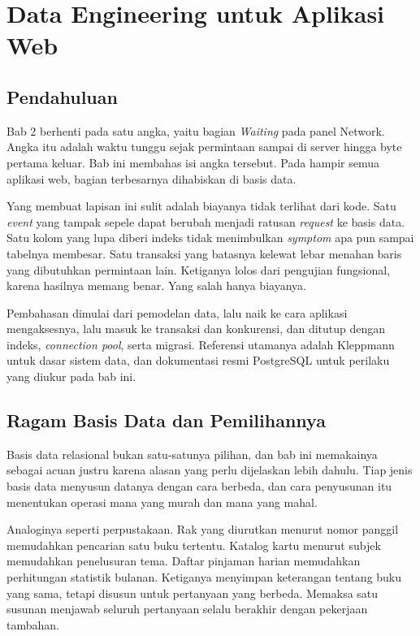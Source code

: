 \chapter{Data Engineering untuk Aplikasi Web}

\section{Pendahuluan}

Bab 2 berhenti pada satu angka, yaitu bagian \emph{Waiting} pada panel Network.
Angka itu adalah waktu tunggu sejak permintaan sampai di server hingga byte
pertama keluar. Bab ini membahas isi angka tersebut. Pada hampir semua aplikasi
web, bagian terbesarnya dihabiskan di basis data.

Yang membuat lapisan ini sulit adalah biayanya tidak terlihat dari kode. Satu
\textit{event} yang tampak sepele dapat berubah menjadi ratusan \textit{request}
ke basis data. Satu kolom yang lupa diberi indeks tidak menimbulkan \textit{symptom} apa
pun sampai tabelnya membesar. Satu transaksi yang batasnya kelewat lebar
menahan baris yang dibutuhkan permintaan lain. Ketiganya lolos dari pengujian
fungsional, karena hasilnya memang benar. Yang salah hanya biayanya.

Pembahasan dimulai dari pemodelan data, lalu naik ke cara aplikasi mengaksesnya,
lalu masuk ke transaksi dan konkurensi, dan ditutup dengan indeks, \textit{connection
pool}, serta migrasi. Referensi utamanya adalah Kleppmann
\cite{kleppmann2017ddia} untuk dasar sistem data, dan dokumentasi resmi
PostgreSQL \cite{pgdoc-explain, pgdoc-mvcc, pgdoc-indexes} untuk perilaku yang
diukur pada bab ini.

\section{Ragam Basis Data dan Pemilihannya}

Basis data relasional bukan satu-satunya pilihan, dan bab ini memakainya
sebagai acuan justru karena alasan yang perlu dijelaskan lebih dahulu. Tiap
jenis basis data menyusun datanya dengan cara berbeda, dan cara penyusunan itu
menentukan operasi mana yang murah dan mana yang mahal.

Analoginya seperti perpustakaan. Rak yang diurutkan menurut nomor panggil
memudahkan pencarian satu buku tertentu. Katalog kartu menurut subjek
memudahkan penelusuran tema. Daftar pinjaman harian memudahkan perhitungan
statistik bulanan. Ketiganya menyimpan keterangan tentang buku yang sama,
tetapi disusun untuk pertanyaan yang berbeda. Memaksa satu susunan menjawab
seluruh pertanyaan selalu berakhir dengan pekerjaan tambahan.

